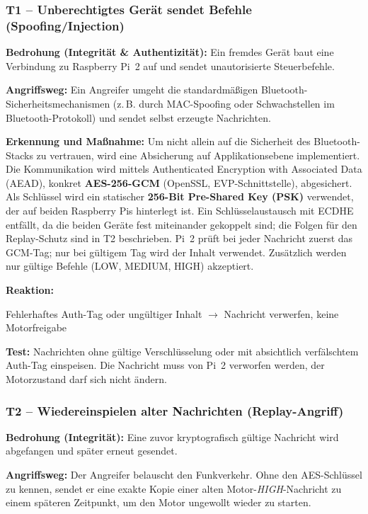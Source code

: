 \subsubsection*{T1 -- Unberechtigtes Gerät sendet Befehle (Spoofing/Injection)}

\textbf{Bedrohung (Integrität \& Authentizität):} Ein fremdes Gerät baut eine
Verbindung zu Raspberry Pi~2 auf und sendet unautorisierte Steuerbefehle.

\textbf{Angriffsweg:} Ein Angreifer umgeht die standardmäßigen
Bluetooth-Sicherheitsmechanismen (z.\,B. durch MAC-Spoofing oder Schwachstellen
im Bluetooth-Protokoll) und sendet selbst erzeugte Nachrichten.

\textbf{Erkennung und Maßnahme:} Um nicht allein auf die Sicherheit des
Bluetooth-Stacks zu vertrauen, wird eine Absicherung auf Applikationsebene
implementiert. Die Kommunikation wird mittels Authenticated Encryption with
Associated Data (AEAD), konkret \textbf{AES-256-GCM} (OpenSSL, EVP-Schnittstelle),
abgesichert. Als Schlüssel wird ein statischer \textbf{256-Bit Pre-Shared Key (PSK)}
verwendet, der auf beiden Raspberry Pis hinterlegt ist. Ein Schlüsselaustausch mit
ECDHE entfällt, da die beiden Geräte fest miteinander gekoppelt sind; die Folgen
für den Replay-Schutz sind in T2 beschrieben. Pi~2 prüft bei jeder Nachricht
zuerst das GCM-Tag; nur bei gültigem Tag wird der Inhalt verwendet. Zusätzlich werden nur gültige Befehle
(LOW, MEDIUM, HIGH) akzeptiert.

\textbf{Reaktion:}
\begin{center}
    Fehlerhaftes Auth-Tag oder ungültiger Inhalt $\rightarrow$ Nachricht verwerfen, keine Motorfreigabe
\end{center}

\textbf{Test:} Nachrichten ohne gültige Verschlüsselung oder mit absichtlich verfälschtem
Auth-Tag einspeisen. Die Nachricht muss von Pi~2 verworfen werden, der
Motorzustand darf sich nicht ändern.

\subsubsection*{T2 -- Wiedereinspielen alter Nachrichten (Replay-Angriff)}

\textbf{Bedrohung (Integrität):} Eine zuvor kryptografisch gültige Nachricht
wird abgefangen und später erneut gesendet.

\textbf{Angriffsweg:} Der Angreifer belauscht den Funkverkehr. Ohne den
AES-Schlüssel zu kennen, sendet er eine exakte Kopie einer alten
Motor-\textit{HIGH}-Nachricht zu einem späteren Zeitpunkt, um den Motor ungewollt
wieder zu starten.

